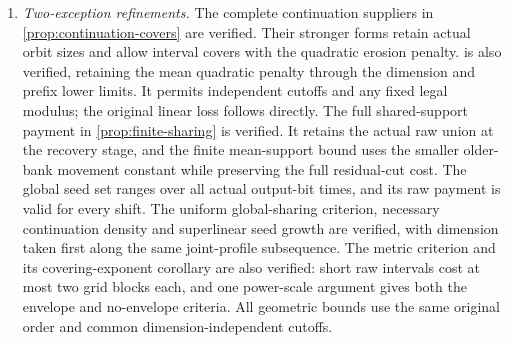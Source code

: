 \begin{enumerate}
\item \emph{Two-exception refinements.}
The complete continuation suppliers in \cref{prop:continuation-covers}
are verified. Their stronger forms retain actual orbit sizes and
allow interval covers with the quadratic erosion penalty.
 is also verified, retaining the mean
quadratic penalty through the dimension and prefix lower limits.
It permits independent cutoffs and any fixed legal modulus; the original
linear loss follows directly. The full shared-support payment in
\cref{prop:finite-sharing} is verified. It retains the actual raw union
at the recovery stage, and the finite mean-support bound uses the smaller
older-bank movement constant while preserving the full residual-cut cost.
The global seed set ranges over all actual output-bit times, and its raw
payment is valid for every shift. The uniform global-sharing criterion,
necessary continuation density and superlinear seed growth are verified,
with dimension taken first along the same joint-profile subsequence.
The metric criterion and its covering-exponent corollary are also verified:
short raw intervals cost at most two grid blocks each, and one power-scale
argument gives both the envelope and no-envelope criteria. All geometric
bounds use the same original order and common dimension-independent cutoffs.


\end{enumerate}
